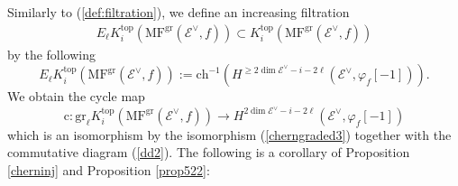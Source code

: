 \documentclass [11pt,oneside,a4paper,mathscr]{amsart}
\theoremstyle{definition}
\renewcommand{\geq}{\geqslant}
\begin{document}


Similarly to (\ref{def:filtration}), we define an increasing filtration \begin{align*}E_\ell K^{\mathrm{top}}_i(\mathrm{MF}^{\mathrm{gr}}(\mathscr{E}^\vee, f))\subset K^{\mathrm{top}}_i(\mathrm{MF}^{\mathrm{gr}}(\mathscr{E}^\vee, f))
\end{align*}
by the following
\[E_\ell K^{\mathrm{top}}_i(\mathrm{MF}^{\mathrm{gr}}(\mathscr{E}^\vee, f)):=\mathrm{ch}^{-1}\left(H^{\geq 2\dim\mathscr{E}^\vee-i-2\ell}(\mathscr{E}^\vee, \varphi_f[-1])\right).\]
We obtain the cycle map 
\[\mathrm{c}\colon\mathrm{gr}_\ell K^{\mathrm{top}}_i(\mathrm{MF}^{\mathrm{gr}}(\mathscr{E}^\vee, f))\to H^{2\dim \mathscr{E}^\vee-i-2\ell}(\mathscr{E}^\vee, \varphi_f[-1])\]
which is an isomorphism by the isomorphism (\ref{cherngraded3}) together with 
the commutative diagram (\ref{dd2}).
The following is a corollary of Proposition \ref{cherninj} and Proposition \ref{prop522}:
\end{document}
